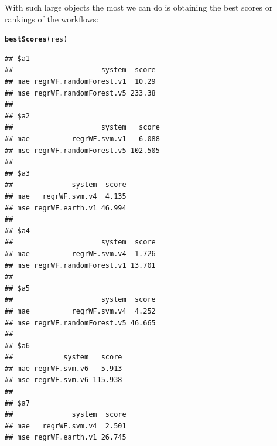 \documentclass[10pt,a4paper]{article}\usepackage[]{graphicx}\usepackage[]{color}
\makeatletter
\newcommand{\hlstd}[1]{\textcolor[rgb]{0.345,0.345,0.345}{#1}}%
\newcommand{\hlkwd}[1]{\textcolor[rgb]{0.737,0.353,0.396}{\textbf{#1}}}%
\newenvironment{kframe}{%
 \def\at@end@of@kframe{}%
 \ifinner\ifhmode%
  \def\at@end@of@kframe{\end{minipage}}%
  \begin{minipage}{\columnwidth}%
 \fi\fi%
 \def\FrameCommand##1{\hskip\@totalleftmargin \hskip-\fboxsep
 \colorbox{shadecolor}{##1}\hskip-\fboxsep
     \hskip-\linewidth \hskip-\@totalleftmargin \hskip\columnwidth}%
 \MakeFramed {\advance\hsize-\width
   \@totalleftmargin\z@ \linewidth\hsize
   \@setminipage}}%
 {\par\unskip\endMakeFramed%
 \at@end@of@kframe}
\newenvironment{knitrout}{}{} %
\makeatother
\begin{document}
With such large objects the most we can do is obtaining the best
scores or rankings of the workflows:

\begin{knitrout}
\color{fgcolor}\begin{kframe}
\begin{alltt}
\hlkwd{bestScores}\hlstd{(res)}
\end{alltt}
\begin{verbatim}
## $a1
##                     system  score
## mae regrWF.randomForest.v1  10.29
## mse regrWF.randomForest.v5 233.38
## 
## $a2
##                     system   score
## mae          regrWF.svm.v1   6.088
## mse regrWF.randomForest.v5 102.505
## 
## $a3
##              system  score
## mae   regrWF.svm.v4  4.135
## mse regrWF.earth.v1 46.994
## 
## $a4
##                     system  score
## mae          regrWF.svm.v4  1.726
## mse regrWF.randomForest.v1 13.701
## 
## $a5
##                     system  score
## mae          regrWF.svm.v4  4.252
## mse regrWF.randomForest.v5 46.665
## 
## $a6
##            system   score
## mae regrWF.svm.v6   5.913
## mse regrWF.svm.v6 115.938
## 
## $a7
##              system  score
## mae   regrWF.svm.v4  2.501
## mse regrWF.earth.v1 26.745
\end{verbatim}
\end{kframe}
\end{knitrout}
\end{document}

